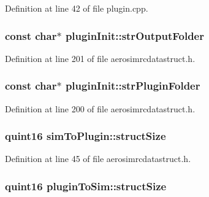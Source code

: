 \-Definition at line 42 of file plugin.\-cpp.

\hypertarget{group___aero_sim_r_c_ga9149810daf40b3b4e5f706faaa8dcc8f}{
\subsubsection[{str\-Output\-Folder}]{\setlength{\rightskip}{0pt plus 5cm}const char$\ast$ {\bf plugin\-Init\-::str\-Output\-Folder}}}\label{group___aero_sim_r_c_ga9149810daf40b3b4e5f706faaa8dcc8f}


\-Definition at line 201 of file aerosimrcdatastruct.\-h.

\hypertarget{group___aero_sim_r_c_ga1ea4ae7485e88859f164a5e904600834}{
\subsubsection[{str\-Plugin\-Folder}]{\setlength{\rightskip}{0pt plus 5cm}const char$\ast$ {\bf plugin\-Init\-::str\-Plugin\-Folder}}}\label{group___aero_sim_r_c_ga1ea4ae7485e88859f164a5e904600834}


\-Definition at line 200 of file aerosimrcdatastruct.\-h.

\hypertarget{group___aero_sim_r_c_gab277fde5232c4a8c41adcdcc1dc7199f}{
\subsubsection[{struct\-Size}]{\setlength{\rightskip}{0pt plus 5cm}quint16 {\bf sim\-To\-Plugin\-::struct\-Size}}}\label{group___aero_sim_r_c_gab277fde5232c4a8c41adcdcc1dc7199f}


\-Definition at line 45 of file aerosimrcdatastruct.\-h.

\hypertarget{group___aero_sim_r_c_ga785b39329b27020e1525b4999a10d230}{
\subsubsection[{struct\-Size}]{\setlength{\rightskip}{0pt plus 5cm}quint16 {\bf plugin\-To\-Sim\-::struct\-Size}}}\label{group___aero_sim_r_c_ga785b39329b27020e1525b4999a10d230}


